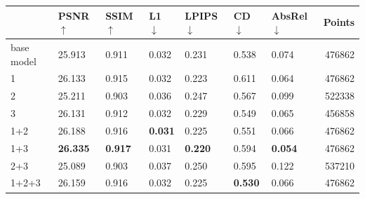 \documentclass[varwidth]{standalone}
\begin{document}
\small
\setlength{\tabcolsep}{4pt}
\begin{tabular}{lllllllr}
\toprule
 & PSNR $\uparrow$ & SSIM $\uparrow$ & L1 $\downarrow$ & LPIPS $\downarrow$ & CD $\downarrow$ & AbsRel $\downarrow$ & Points \\
\midrule
base model & 25.913 & 0.911 & 0.032 & 0.231 & 0.538 & 0.074 & 476862 \\
1 & 26.133 & 0.915 & 0.032 & 0.223 & 0.611 & 0.064 & 476862 \\
2 & 25.211 & 0.903 & 0.036 & 0.247 & 0.567 & 0.099 & 522338 \\
3 & 26.131 & 0.912 & 0.032 & 0.229 & 0.549 & 0.065 & 456858 \\
1+2 & 26.188 & 0.916 & \textbf{0.031} & 0.225 & 0.551 & 0.066 & 476862 \\
1+3 & \textbf{26.335} & \textbf{0.917} & 0.031 & \textbf{0.220} & 0.594 & \textbf{0.054} & 476862 \\
2+3 & 25.089 & 0.903 & 0.037 & 0.250 & 0.595 & 0.122 & 537210 \\
1+2+3 & 26.159 & 0.916 & 0.032 & 0.225 & \textbf{0.530} & 0.066 & 476862 \\
\bottomrule
\end{tabular}
\end{document}
